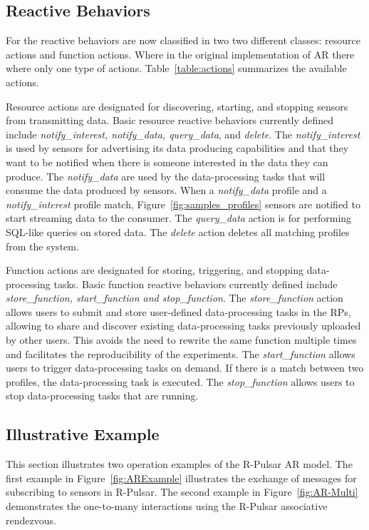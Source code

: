 \subsection{Reactive Behaviors} 

For the reactive behaviors are now classified in two two different classes: resource actions and function actions. Where in the original implementation of AR there where only one type of actions. Table~\ref{table:actions} summarizes the available actions.

Resource actions are designated for discovering, starting, and stopping sensors from transmitting data. Basic resource reactive behaviors currently defined include {\it notify\_interest, notify\_data, query\_data}, and {\it delete}. The {\it notify\_interest} is used by sensors for advertising its data producing capabilities and that they want to be notified when there is someone interested in the data they can produce. The {\it notify\_data} are used by the data-processing tasks that will consume the data produced by sensors. When a {\it notify\_data} profile and a {\it notify\_interest} profile match, Figure~\ref{fig:samples_profiles} sensors are notified to start streaming data to the consumer. The {\it query\_data } action is for performing SQL-like queries on stored data. The {\it delete} action deletes all matching profiles from the system.

Function actions are designated for storing, triggering, and stopping data-processing tasks. Basic function reactive behaviors currently defined include {\it store\_function, start\_function and stop\_function}. The {\it store\_function} action allows users to submit and store user-defined data-processing tasks in the RPs, allowing to share and discover existing data-processing tasks previously uploaded by other users. This avoids the need to rewrite the same function multiple times and facilitates the reproducibility of the experiments. The {\it start\_function} allows users to trigger data-processing tasks on demand. If there is a match between two profiles, the data-processing task is executed. The {\it stop\_function} allows users to stop data-processing tasks that are running. 

\subsection{Illustrative Example}

This section illustrates two operation examples of the R-Pulsar AR model. The first example in Figure~\ref{fig:ARExample} illustrates the exchange of messages for subscribing to sensors in R-Pulsar. The second example in Figure~\ref{fig:AR-Multi} demonstrates the one-to-many interactions using the R-Pulsar associative rendezvous.

